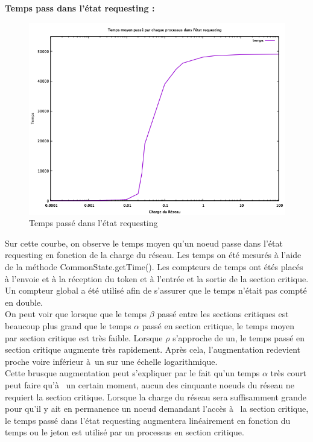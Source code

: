 \documentclass[11pt,a4paper]{report}
\begin{document}
\textbf{Temps pass dans l'état requesting :}

\begin{figure}
	\begin{center}
		\includegraphics[scale=0.6]{Temps_etat_requesting.png}
	\end{center}
	\caption{\label{etat\_requesting} Temps passé dans l'état requesting}
\end{figure}

Sur cette courbe, on observe le temps moyen qu'un noeud passe dans l'état requesting en fonction de la charge du réseau. Les temps on été mesurés à l'aide de la méthode CommonState.getTime(). Les compteurs de temps ont étés placés à l'envoie et à la réception du token et à l'entrée et la sortie de la section critique. Un compteur global a été utilisé afin de s'assurer que le temps n'était pas compté en double.\\

On peut voir que lorsque que le temps $\beta$ passé entre les sections critiques est beaucoup plus grand que le temps $\alpha$ passé en section critique, le temps moyen par section critique est très faible. Lorsque $\rho$ s'approche de un, le temps passé en section critique augmente très rapidement. Après cela, l'augmentation redevient proche voire inférieur à un sur une échelle logarithmique.\\

Cette brusque augmentation peut s'expliquer par le fait qu'un temps $\alpha$ très court peut faire qu'à  un certain moment, aucun des cinquante noeuds du réseau ne requiert la section critique. Lorsque la charge du réseau sera suffisamment grande pour qu'il y ait en permanence un noeud demandant l'accès à  la section critique, le temps passé dans l'état requesting augmentera linéairement en fonction du temps ou le jeton est utilisé par un processus en section critique.\\
\end{document}
